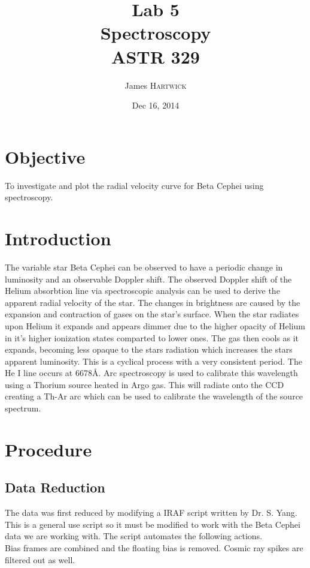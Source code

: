 \documentclass{article}
\title{Lab 5 \\ Spectroscopy \\ ASTR 329} %
\author{James \textsc{Hartwick}} %
\date{Dec 16, 2014} %
\begin{document}
\maketitle %



\section{Objective}
To investigate and plot the radial velocity curve for Beta Cephei using spectroscopy.
\section{Introduction}
The variable star Beta Cephei can be observed to have a periodic change in luminosity and an observable Doppler shift. The observed Doppler shift of the Helium absorbtion line via spectroscopic analysis can be used to derive the apparent radial velocity of the star. The changes in brightness are caused by the expansion and contraction of gases on the star's surface. When the star radiates upon Helium it expands and appears dimmer due to the higher opacity of Helium in it's higher ionization states comparted to lower ones. The gas then cools as it expands, becoming less opaque to the stars radiation which increases the stars apparent luminosity. This is a cyclical process with a very consistent period. The He I line occurs at 6678\AA. Arc spectroscopy is used to calibrate this wavelength using a Thorium source heated in Argo gas. This will radiate onto the CCD creating a Th-Ar arc which can be used to calibrate the wavelength of the source spectrum.

\section{Procedure}
\subsection{Data Reduction}
The data was first reduced by modifying a IRAF script written by Dr. S. Yang. This is a general use script so it must be modified to work with the Beta Cephei data we are working with. The script automates the following actions.\\

Bias frames are combined and the floating bias is removed. Cosmic ray spikes are filtered out as well.\\
\end{document}
